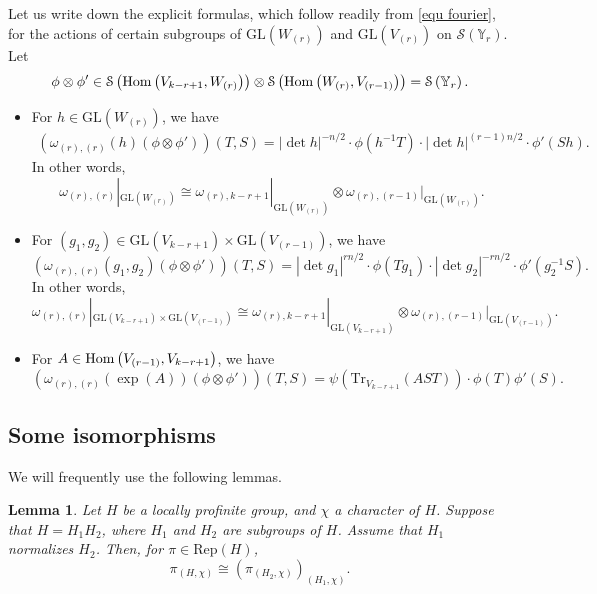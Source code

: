 \documentclass[11pt,reqno]{amsart}
\renewcommand{\1}{{\mathbf{1}}} \newcommand{\sB}{{\mathscr{B}}}
\newcommand{\BY}{{\mathbb {Y}}} \newcommand{\BZ}{{\mathbb {Z}}}
\newcommand{\CS}{{\mathcal {S}}} \newcommand{\CT}{{\mathcal {T}}}
\newcommand{\GL}{{\mathrm{GL}}}\newcommand{\G}{{\mathrm{G}}}
\newcommand{\Rep}{{\mathrm{Rep}}}\newcommand{\rec}{{\mathrm{rec}}} \newcommand{\rat}{{\mathrm{ra}}}
\newcommand{\Tr}{{\mathrm{Tr}}}
\theoremstyle{plain}
\newtheorem{lem}[thm]{Lemma}  \newtheorem{prop}[thm]{Proposition}
\theoremstyle{definition}
\numberwithin{equation}{section}
\begin{document}
Let us write down the explicit formulas, which follow readily from \eqref{equ fourier}, for the actions of certain subgroups of $\GL(W_{(r)})$ and $\GL(V_{(r)})$ on $\CS\left(\BY_r\right)$. Let $$\phi\otimes\phi'\in \CS\left(\Hom\left(V_{k-r+1},W_{(r)}\right)\right)\otimes\CS\left(\Hom\left(W_{(r)},V_{(r-1)}\right)\right)=\CS\left(\BY_r\right).$$
\begin{itemize}
\item For $h\in\GL(W_{(r)})$,  we have
\begin{equation}\label{equ action1}\begin{aligned}\left(\omega_{(r),(r)}(h)(\phi\otimes\phi')\right)(T,S)=|\det h|^{-n/2}\cdot\phi(h^{-1}T)\cdot|\det h|^{(r-1)n/2}\cdot\phi'(Sh).
\end{aligned}\end{equation} In other words,
$$\omega_{(r),(r)}|_{\GL(W_{(r)})}
\cong\omega_{(r),k-r+1}|_{\GL(W_{(r)})}\otimes \omega_{(r),(r-1)}|_{\GL(W_{(r)})}.$$
\item For $(g_1,g_2)\in\GL(V_{k-r+1})\times\GL(V_{(r-1)})$, we have 
\begin{equation}\label{equ action2}\left(\omega_{(r),(r)}(g_1,g_2)(\phi\otimes\phi')\right)(T,S)=|\det g_1|^{rn/2}\cdot\phi(Tg_1)\cdot |\det g_2|^{-rn/2}\cdot\phi'(g_2^{-1}S).\end{equation}
In other words, $$\omega_{(r),(r)}|_{\GL(V_{k-r+1})\times\GL(V_{(r-1)})}\cong\omega_{(r), k-r+1}|_{\GL(V_{k-r+1})}\otimes\omega_{(r),(r-1)}|_{\GL(V_{(r-1)})}.$$
\item For $A\in{\mathrm{Hom}}\left(V_{(r-1)},V_{k-r+1}\right)$, we have  \begin{equation}\label{equ action3}\left(\omega_{(r),(r)}(\exp(A))(\phi\otimes \phi')\right)(T,S)=\psi\left(\Tr_{V_{k-r+1}}(AST)\right)\cdot\phi(T)\phi'(S).\end{equation}
\end{itemize}

\subsection{Some isomorphisms}

We will frequently use the following  lemmas.

\begin{lem}\label{lem coinvariant}\cite{mvw}
Let $H$ be a locally profinite group, and $\chi$ a character of $H$. Suppose that $H=H_1H_2$, where $H_1$ and $H_2$ are subgroups of $H$. Assume that $H_1$ normalizes $H_2$. Then, for $\pi\in\Rep(H)$,
$$\pi_{(H,\chi)}\cong \left(\pi_{(H_2,\chi)}\right)_{(H_1,\chi)}.$$
\end{lem} 
\end{document}
